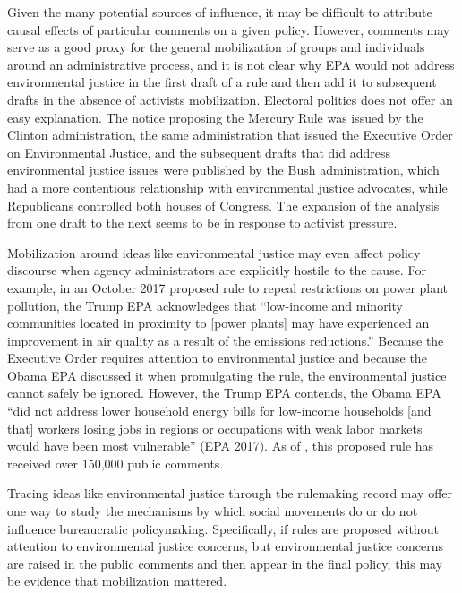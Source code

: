 \documentclass[
      12pt,
        ]{article}
\begin{document}
Given the many potential sources of influence, it may be difficult to
attribute causal effects of particular comments on a given policy.
However, comments may serve as a good proxy for the general mobilization
of groups and individuals around an administrative process, and it is
not clear why EPA would not address environmental justice in the first
draft of a rule and then add it to subsequent drafts in the absence of
activists mobilization. Electoral politics does not offer an easy
explanation. The notice proposing the Mercury Rule was issued by the
Clinton administration, the same administration that issued the
Executive Order on Environmental Justice, and the subsequent drafts that
did address environmental justice issues were published by the Bush
administration, which had a more contentious relationship with
environmental justice advocates, while Republicans controlled both
houses of Congress. The expansion of the analysis from one draft to the
next seems to be in response to activist pressure.

Mobilization around ideas like environmental justice may even affect
policy discourse when agency administrators are explicitly hostile to
the cause. For example, in an October 2017 proposed rule to repeal
restrictions on power plant pollution, the Trump EPA acknowledges that
``low-income and minority communities located in proximity to {[}power
plants{]} may have experienced an improvement in air quality as a result
of the emissions reductions.'' Because the Executive Order requires
attention to environmental justice and because the Obama EPA discussed
it when promulgating the rule, the environmental justice cannot safely
be ignored. However, the Trump EPA contends, the Obama EPA ``did not
address lower household energy bills for low-income households {[}and
that{]} workers losing jobs in regions or occupations with weak labor
markets would have been most vulnerable'' (EPA 2017). As of , this
proposed rule has received over 150,000 public comments.

Tracing ideas like environmental justice through the rulemaking record
may offer one way to study the mechanisms by which social movements do
or do not influence bureaucratic policymaking. Specifically, if rules
are proposed without attention to environmental justice concerns, but
environmental justice concerns are raised in the public comments and
then appear in the final policy, this may be evidence that mobilization
mattered.
\end{document}
